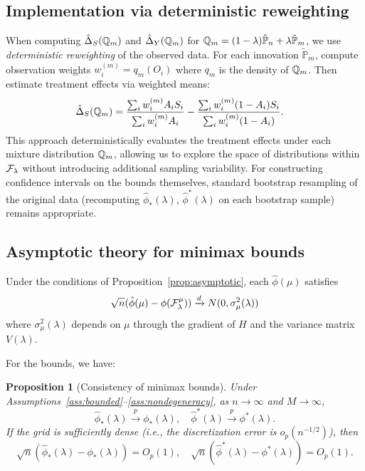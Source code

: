 \documentclass{article}
\newtheorem{proposition}{Proposition}
\newcommand{\PP}{\mathbb{P}}
\begin{document}
\subsection{Implementation via deterministic reweighting}

When computing $\hat{\Delta}_S(\mathbb{Q}_m)$ and $\hat{\Delta}_Y(\mathbb{Q}_m)$ for $\Q_m = (1-\lambda)\hat{\PP}_n + \lambda\tilde{\PP}_m$, we use \emph{deterministic reweighting} of the observed data. For each innovation $\tilde{\PP}_m$, compute observation weights $w_i^{(m)} = q_m(O_i)$ where $q_m$ is the density of $\mathbb{Q}_m$. Then estimate treatment effects via weighted means:
\begin{align*}
    \hat{\Delta}_S(\mathbb{Q}_m) &= \frac{\sum_i w_i^{(m)} A_i S_i}{\sum_i w_i^{(m)} A_i} - \frac{\sum_i w_i^{(m)} (1-A_i) S_i}{\sum_i w_i^{(m)} (1-A_i)}.
\end{align*}
This approach deterministically evaluates the treatment effects under each mixture distribution $\mathbb{Q}_m$, allowing us to explore the space of distributions within $\mathcal{F}_\lambda$ without introducing additional sampling variability. For constructing confidence intervals on the bounds themselves, standard bootstrap resampling of the original data (recomputing $\hat{\phi}_*(\lambda)$, $\hat{\phi}^*(\lambda)$ on each bootstrap sample) remains appropriate.

\subsection{Asymptotic theory for minimax bounds}

Under the conditions of Proposition~\ref{prop:asymptotic}, each $\hat{\phi}(\mu)$ satisfies
\[
    \sqrt{n}(\hat{\phi}(\mu) - \phi(\mathcal{F}_\lambda^\mu)) \xrightarrow{d} N(0, \sigma^2_\mu(\lambda))
\]
where $\sigma^2_\mu(\lambda)$ depends on $\mu$ through the gradient of $H$ and the variance matrix $V(\lambda)$.

For the bounds, we have:

\begin{proposition}[Consistency of minimax bounds]\label{prop:minimax-consistency}
Under Assumptions~\ref{ass:bounded}--\ref{ass:nondegeneracy}, as $n \to \infty$ and $M \to \infty$,
\[
    \hat{\phi}_*(\lambda) \xrightarrow{p} \phi_*(\lambda), \quad \hat{\phi}^*(\lambda) \xrightarrow{p} \phi^*(\lambda).
\]
If the grid is sufficiently dense (i.e., the discretization error is $o_p(n^{-1/2})$), then
\[
    \sqrt{n}(\hat{\phi}_*(\lambda) - \phi_*(\lambda)) = O_p(1), \quad \sqrt{n}(\hat{\phi}^*(\lambda) - \phi^*(\lambda)) = O_p(1).
\]
\end{proposition}
\end{document}
